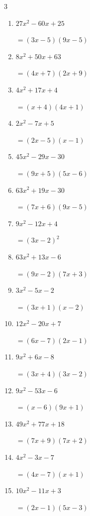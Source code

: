 \begin{multicols}{3}
\begin{enumerate}
        $=(2x-1)(7x+4)$

  \item $27x^{2}-60x+25$

        $=(3x-5)(9x-5)$

  \item $8x^{2}+50x+63$

        $=(4x+7)(2x+9)$

  \item $4x^{2}+17x+4$

        $=(x+4)(4x+1)$

  \item $2x^{2}-7x+5$

        $=(2x-5)(x-1)$

  \item $45x^{2}-29x-30$

        $=(9x+5)(5x-6)$

\columnbreak %

  \item $63x^{2}+19x-30$

        $=(7x+6)(9x-5)$

  \item $9x^{2}-12x+4$

        $=(3x-2)^{2}$

  \item $63x^{2}+13x-6$

        $=(9x-2)(7x+3)$

  \item $3x^{2}-5x-2$

        $=(3x+1)(x-2)$

  \item $12x^{2}-20x+7$

        $=(6x-7)(2x-1)$

  \item $9x^{2}+6x-8$

        $=(3x+4)(3x-2)$

  \item $9x^{2}-53x-6$

        $=(x-6)(9x+1)$

  \item $49x^{2}+77x+18$

        $=(7x+9)(7x+2)$

  \item $4x^{2}-3x-7$

        $=(4x-7)(x+1)$

  \item $10x^{2}-11x+3$

        $=(2x-1)(5x-3)$


\end{enumerate}
\end{multicols}
